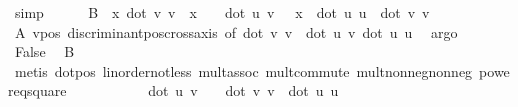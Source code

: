 \begin{isabellebody}
\ simp\isanewline
\ \ \ \ \isamarkupfalse%
\ B{\isacharcolon}{\kern0pt}\ {\isachardoublequoteopen}{\isasymexists}\ x{\isachardot}{\kern0pt}\ {\isacharparenleft}{\kern0pt}{\isacharparenleft}{\kern0pt}dot\ v\ v{\isacharparenright}{\kern0pt}\ {\isacharasterisk}{\kern0pt}\ x\ {\isacharplus}{\kern0pt}\ {\isacharparenleft}{\kern0pt}{}\ {\isacharasterisk}{\kern0pt}\ dot\ u\ v{\isacharparenright}{\kern0pt}\ \ {\isacharasterisk}{\kern0pt}\ x\ {\isacharplus}{\kern0pt}\ dot\ u\ u{\isacharparenright}{\kern0pt}\ {\isacharasterisk}{\kern0pt}\ {\isacharparenleft}{\kern0pt}dot\ v\ v{\isacharparenright}{\kern0pt}\ {\isacharless}{\kern0pt}\ {}{\isachardoublequoteclose}\ \isanewline
\ \ \ \ \ \ \isamarkupfalse%
\ A\ vpos\ discriminant{\isacharunderscore}{\kern0pt}pos{\isacharunderscore}{\kern0pt}cross{\isacharunderscore}{\kern0pt}axis\ {\isacharbrackleft}{\kern0pt}of\ {\isachardoublequoteopen}{\isacharparenleft}{\kern0pt}dot\ v\ v{\isacharparenright}{\kern0pt}{\isachardoublequoteclose}\ {\isachardoublequoteopen}{}{\isacharasterisk}{\kern0pt}\ {\isacharparenleft}{\kern0pt}dot\ u\ v{\isacharparenright}{\kern0pt}{\isachardoublequoteclose}\ {\isachardoublequoteopen}{\isacharparenleft}{\kern0pt}dot\ u\ u{\isacharparenright}{\kern0pt}{\isachardoublequoteclose}{\isacharbrackright}{\kern0pt}\ \isamarkupfalse%
\ argo\isanewline
\ \ \ \ \isamarkupfalse%
\ {\isachardoublequoteopen}False{\isachardoublequoteclose}\ \isamarkupfalse%
\ B\ {}\ \ \isamarkupfalse%
\ {\isacharparenleft}{\kern0pt}metis\ dot{\isacharunderscore}{\kern0pt}pos\ linorder{\isacharunderscore}{\kern0pt}not{\isacharunderscore}{\kern0pt}less\ mult{\isachardot}{\kern0pt}assoc\ mult{\isachardot}{\kern0pt}commute\ mult{\isacharunderscore}{\kern0pt}nonneg{\isacharunderscore}{\kern0pt}nonneg\ power{}{\isacharunderscore}{\kern0pt}eq{\isacharunderscore}{\kern0pt}square{\isacharparenright}{\kern0pt}\isanewline
\ \ \isamarkupfalse%
\ \isanewline
\ \ \isamarkupfalse%
\ {}{\isacharcolon}{\kern0pt}\ {\isachardoublequoteopen}{\isacharparenleft}{\kern0pt}{}\ {\isacharasterisk}{\kern0pt}\ dot\ u\ v{\isacharparenright}{\kern0pt}{\isacharcircum}{\kern0pt}{}\ {\isacharminus}{\kern0pt}\ {}\ {\isacharasterisk}{\kern0pt}\ {\isacharparenleft}{\kern0pt}dot\ v\ v{\isacharparenright}{\kern0pt}\ {\isacharasterisk}{\kern0pt}\ {\isacharparenleft}{\kern0pt}dot\ u\ u{\isacharparenright}{\kern0pt}\ {\isasymle}\ {}{\isachardoublequoteclose}\ \isamarkupfalse%

\end{isabellebody}
